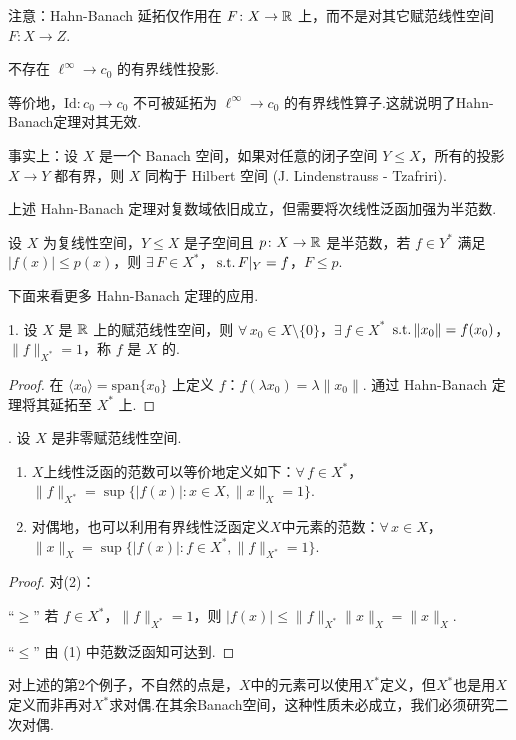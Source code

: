 \begin{remark}
    注意：Hahn-Banach 延拓仅作用在 $F \colon X \to \mathbb{R}$ 上，而不是对其它赋范线性空间 $F \colon X \to Z$.
\end{remark}

\begin{theorem}[Philips, 1948]
    不存在 $\ell^\infty \to c_0$ 的有界线性投影.
\end{theorem}
等价地，$\mathrm{Id} \colon c_0 \to c_0$ 不可被延拓为 $\ell^\infty \to c_0$ 的有界线性算子.这就说明了Hahn-Banach定理对其无效.\par
事实上：设 $X$ 是一个 Banach 空间，如果对任意的闭子空间 $Y \leq X$，所有的投影 $X \to Y$ 都有界，则 $X$ 同构于 Hilbert 空间 (J. Lindenstrauss - Tzafriri).\par

上述 Hahn-Banach 定理对复数域依旧成立，但需要将次线性泛函加强为半范数.

\begin{theorem}
    设 $X$ 为复线性空间，$Y \leq X$ 是子空间且 $p\colon X \to \mathbb{R}$ 是半范数，若 $f \in Y^*$ 满足 $|f(x)| \leq p(x)$，则 $\exists\, F \in X^*$，$\operatorname{\,\text{s.t.}} F|_Y = f$，$F \leq p$.
\end{theorem}

下面来看更多 Hahn-Banach 定理的应用.

\begin{instance}
    1. 设 $X$ 是 $\mathbb{R}$ 上的赋范线性空间，则 $\forall\, x_0 \in X \setminus \{0\}$，$\exists\, f \in X^*$ $\operatorname{\,\text{s.t.}} \|x_0\| = f(x_0)$，$\|f\|_{X^*} = 1$，称 $f$ 是 $X$ 的.

    \begin{proof}
        在 $\langle x_0 \rangle = \mathrm{span}\{x_0\}$ 上定义 $f$：$f(\lambda x_0) = \lambda \|x_0\|$.
        通过 Hahn-Banach 定理将其延拓至 $X^*$ 上.
    \end{proof}
    . 设 $X$ 是非零赋范线性空间.\par
    \begin{enumerate}[label=(\arabic*),leftmargin=2em]
        \item $X$上线性泛函的范数可以等价地定义如下：$\forall\,f \in X^*$，$\|f\|_{X^*} = \sup \{|f(x)|: x \in X, \|x\|_X = 1\}$.
        \item 对偶地，也可以利用有界线性泛函定义$X$中元素的范数：$\forall\, x \in X$，$\|x\|_X = \sup \{|f(x)|: f \in X^*, \|f\|_{X^*} = 1\}$.
    \end{enumerate}

    \begin{proof}
        对(2)：\par
        “$\geq$” 若 $f \in X^*$，$\|f\|_{X^*} = 1$，则 $|f(x)| \leq \|f\|_{X^*} \|x\|_X = \|x\|_X$.\par
        “$\leq$” 由 (1) 中范数泛函知可达到.
    \end{proof}
\end{instance}
对上述的第2个例子，不自然的点是，$X$中的元素可以使用$X^*$定义，但$X^*$也是用$X$定义而非再对$X^*$求对偶.在其余Banach空间，这种性质未必成立，我们必须研究二次对偶.

